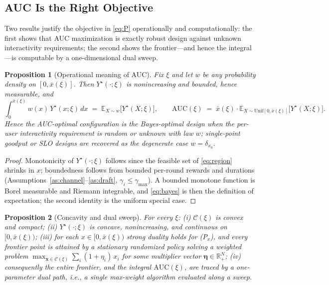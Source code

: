 \documentclass[11pt]{article}
\newtheorem{proposition}{Proposition}
\theoremstyle{definition}
\theoremstyle{remark}
\newcommand{\E}{\mathbb{E}}
\newcommand{\R}{\mathbb{R}}
\newcommand{\cC}{\mathcal{C}}
\newcommand{\auc}{\mathrm{AUC}}
\newcommand{\bx}{\mathbf{x}}
\begin{document}
\subsection{AUC Is the Right Objective}\label{ssec:whyauc}

Two results justify the objective in \eqref{eq:P} operationally and
computationally: the first shows that AUC maximization is exactly robust
design against unknown interactivity requirements; the second shows the
frontier---and hence the integral---is computable by a one-dimensional dual
sweep.

\begin{proposition}[Operational meaning of AUC]\label{prop:meaning}
Fix $\xi$ and let $w$ be any probability density on $[0,\bar{x}(\xi)]$. Then
$Y^{\star}(\cdot;\xi)$ is nonincreasing and bounded, hence measurable, and
\begin{equation}\label{eq:bayes}
\int_{0}^{\bar{x}(\xi)}w(x)\,Y^{\star}(x;\xi)\,dx
\;=\;\E_{X\sim w}\bigl[Y^{\star}(X;\xi)\bigr],
\qquad
\auc(\xi)\;=\;\bar{x}(\xi)\cdot
\E_{X\sim\mathrm{Unif}[0,\bar{x}(\xi)]}\bigl[Y^{\star}(X;\xi)\bigr].
\end{equation}
Hence the AUC-optimal configuration is the Bayes-optimal design when the
per-user interactivity requirement is random or unknown with law $w$;
single-point goodput or SLO designs are recovered as the degenerate case
$w=\delta_{x_0}$.
\end{proposition}

\begin{proof}
Monotonicity of $Y^{\star}(\cdot;\xi)$ follows since the feasible set of
\eqref{eq:region} shrinks in $x$; boundedness follows from bounded per-round
rewards and durations (Assumptions~\ref{as:channel}--\ref{as:draft},
$\gamma_i\le\gamma_{\max}$). A bounded monotone function is Borel measurable
and Riemann integrable, and \eqref{eq:bayes} is then the definition of
expectation; the second identity is the uniform special case.
\end{proof}

\begin{proposition}[Concavity and dual sweep]\label{prop:dual}
For every $\xi$: (i) $\cC(\xi)$ is convex and compact; (ii)
$Y^{\star}(\cdot;\xi)$ is concave, nonincreasing, and continuous on
$[0,\bar{x}(\xi))$; (iii) for each $x\in[0,\bar{x}(\xi))$ strong duality
holds for \emph{(P$_x$)}, and every frontier point is attained by a
stationary randomized policy solving a \emph{weighted} problem
$\max_{\bx\in\cC(\xi)}\sum_{i}(1+\eta_i)\,x_i$ for some multiplier vector
$\bm{\eta}\in\R_+^N$; (iv) consequently the entire frontier, and the integral
$\auc(\xi)$, are traced by a one-parameter dual path, i.e., a single
max-weight algorithm evaluated along a sweep.
\end{proposition}
\end{document}
